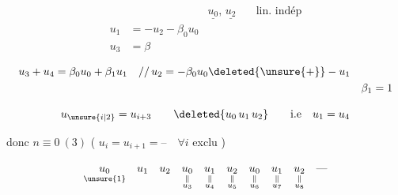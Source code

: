 \[
\boxed{\begin{aligned}
&&\underline{u_0},\,\underline{u_2}\quad &\text{lin. indép}\\
u_1&=-u_2-\beta_0u_0\\
u_3&=\beta
\end{aligned}}
\]

\[
\begin{aligned}
u_3+u_4&=\beta_0u_0+\beta_1u_1\quad //\, u_2=-\beta_0u_0\deleted{\unsure{+}}-u_1\\
&&\beta_1=1
\end{aligned}
\]

\[
u_{\unsure{i|2}}=u_{i+3}\qquad\deleted{u_0\,u_1\,u_2}\qquad\text{i.e}\quad u_1=u_4
\]

donc $n\equiv0\ (3)$ ( $u_i=u_{i+1}=\text{--}\quad\forall i$ exclu \unsure{---})

\[
\underset{\unsure{1}}{u_0}\quad u_1\quad u_2\quad
\underset{\substack{\Vert\\u_3}}{u_0}\quad\underset{\substack{\Vert\\u_4}}{u_1}\quad
\underset{\substack{\Vert\\u_5}}{u_2}\quad\underset{\substack{\Vert\\u_6}}{u_0}\quad
\underset{\substack{\Vert\\u_7}}{u_1}\quad\underset{\substack{\Vert\\u_8}}{u_2}\quad\text{---}
\]

